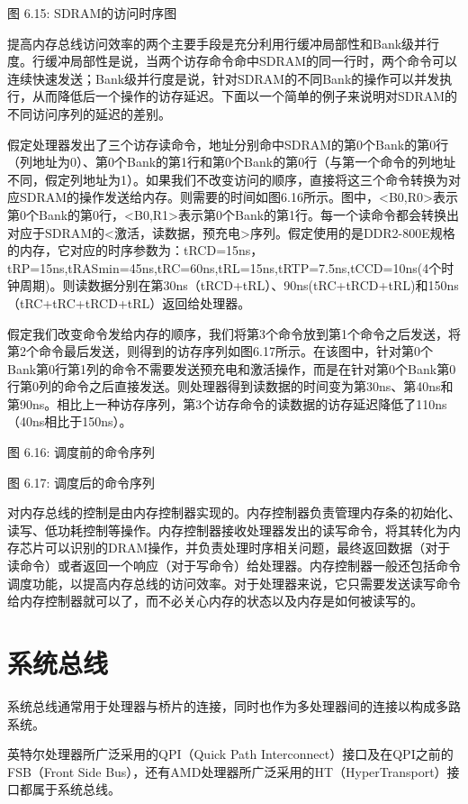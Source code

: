 \documentclass[]{ctexbook}
\begin{document}
图 6.15: SDRAM的访问时序图

提高内存总线访问效率的两个主要手段是充分利用行缓冲局部性和Bank级并行度。行缓冲局部性是说，当两个访存命令命中SDRAM的同一行时，两个命令可以连续快速发送；Bank级并行度是说，针对SDRAM的不同Bank的操作可以并发执行，从而降低后一个操作的访存延迟。下面以一个简单的例子来说明对SDRAM的不同访问序列的延迟的差别。

假定处理器发出了三个访存读命令，地址分别命中SDRAM的第0个Bank的第0行（列地址为0）、第0个Bank的第1行和第0个Bank的第0行（与第一个命令的列地址不同，假定列地址为1）。如果我们不改变访问的顺序，直接将这三个命令转换为对应SDRAM的操作发送给内存。则需要的时间如图6.16所示。图中，\textless B0,R0\textgreater 表示第0个Bank的第0行，\textless B0,R1\textgreater 表示第0个Bank的第1行。每一个读命令都会转换出对应于SDRAM的\textless 激活，读数据，预充电\textgreater 序列。假定使用的是DDR2-800E规格的内存，它对应的时序参数为：tRCD=15ns，tRP=15ns,tRASmin=45ns,tRC=60ns,tRL=15ns,tRTP=7.5ns,tCCD=10ns(4个时钟周期)。则读数据分别在第30ns（tRCD+tRL）、90ns(tRC+tRCD+tRL)和150ns（tRC+tRC+tRCD+tRL）返回给处理器。

假定我们改变命令发给内存的顺序，我们将第3个命令放到第1个命令之后发送，将第2个命令最后发送，则得到的访存序列如图6.17所示。在该图中，针对第0个Bank第0行第1列的命令不需要发送预充电和激活操作，而是在针对第0个Bank第0行第0列的命令之后直接发送。则处理器得到读数据的时间变为第30ns、第40ns和第90ns。相比上一种访存序列，第3个访存命令的读数据的访存延迟降低了110ns（40ns相比于150ns）。

图 6.16: 调度前的命令序列

图 6.17: 调度后的命令序列

对内存总线的控制是由内存控制器实现的。内存控制器负责管理内存条的初始化、读写、低功耗控制等操作。内存控制器接收处理器发出的读写命令，将其转化为内存芯片可以识别的DRAM操作，并负责处理时序相关问题，最终返回数据（对于读命令）或者返回一个响应（对于写命令）给处理器。内存控制器一般还包括命令调度功能，以提高内存总线的访问效率。对于处理器来说，它只需要发送读写命令给内存控制器就可以了，而不必关心内存的状态以及内存是如何被读写的。

\hypertarget{ux7cfbux7edfux603bux7ebf}{%
\section{系统总线}\label{ux7cfbux7edfux603bux7ebf}}

系统总线通常用于处理器与桥片的连接，同时也作为多处理器间的连接以构成多路系统。

英特尔处理器所广泛采用的QPI（Quick Path Interconnect）接口及在QPI之前的FSB（Front Side Bus），还有AMD处理器所广泛采用的HT（HyperTransport）接口都属于系统总线。
\end{document}
